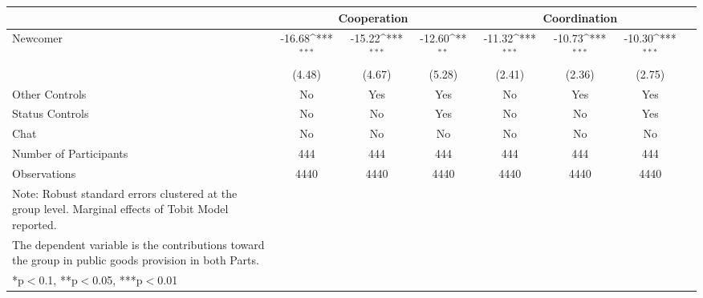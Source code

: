 {\tiny
\def\sym#1{\ifmmode^{#1}\else\(^{#1}\)\fi}
\begin{tabular}{l*{7}{c}}
\toprule
          & \multicolumn{3}{c}{Cooperation}   &\multicolumn{3}{c}{Coordination}     \\
\midrule
Newcomer   &     -16.68\sym{***} &     -15.22\sym{***}  &  -12.60\sym{**}  &  -11.32\sym{***} &     -10.73\sym{***}  &  -10.30\sym{***}  \\
  &     (4.48)          &     (4.67)          &  (5.28) &     (2.41)          &     (2.36)           &  (2.75)  \\

\midrule
Other Controls   &    No &    Yes &    Yes    &    No  &    Yes &    Yes             \\
Status Controls &    No  &    No    &    Yes    &    No  &    No    &    Yes           \\
Chat  &    No    &    No   &    No  &    No    &    No   &    No             \\
\midrule
Number of Participants &    444 &    444  &    444  &    444 &    444  &    444     \\
\midrule
Observations          &  4440  & 4440  &  4440  &  4440  & 4440  &  4440            \\
\bottomrule
Note: Robust standard errors clustered at the group level. Marginal effects of Tobit Model reported. \\
The dependent variable is the contributions toward the group in public goods provision in both Parts. \\
*p$<$0.1, **p$<$0.05, ***p$<$0.01
\end{tabular}
}
